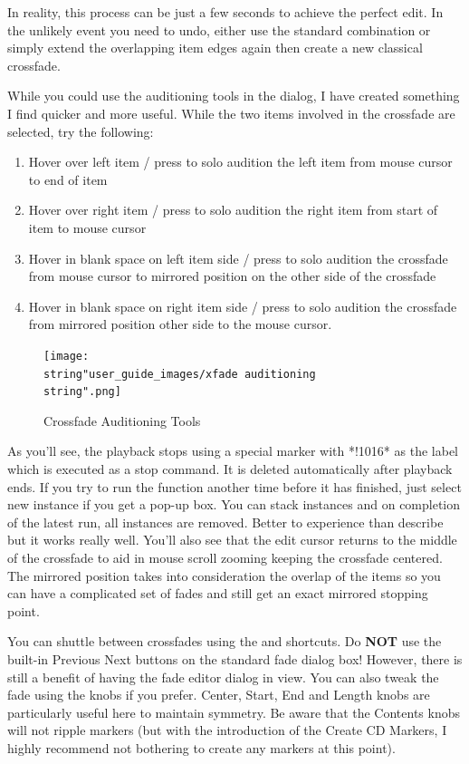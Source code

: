 \documentclass[10pt,american]{article}
\begin{document}
In reality, this process can be just a few seconds to achieve the perfect edit.
In the unlikely event you need to undo, either use the standard 
combination or simply extend the overlapping item edges again then create a new
classical crossfade.

While you could use the auditioning tools in the dialog, I have created
something I find quicker and more useful. While the two items involved in the
crossfade are selected, try the following:
\begin{enumerate}
\item Hover over left item / press  to solo audition the left item from
mouse cursor to end of item
\item Hover over right item / press  to solo audition the right item
from start of item to mouse cursor
\item Hover in blank space on left item side / press  to solo audition
the crossfade from mouse cursor to mirrored position on the other side of the
crossfade
\item Hover in blank space on right item side / press  to solo audition
the crossfade from mirrored position other side to the mouse cursor.
\end{enumerate}
\begin{figure}
\texttt{[image: \\string"user\_guide\_images/xfade auditioning\\string".png]}

\caption{Crossfade Auditioning Tools}

\end{figure}

As you'll see, the playback stops using a special marker with {*}!1016{*} as the
label which is executed as a stop command. It is deleted automatically after
playback ends. If you try to run the function another time before it has
finished, just select new instance if you get a pop-up box. You can stack
instances and on completion of the latest run, all instances are removed. Better
to experience than describe but it works really well. You'll also see that the
edit cursor returns to the middle of the crossfade to aid in mouse scroll
zooming keeping the crossfade centered. The mirrored position takes into
consideration the overlap of the items so you can have a complicated set of
fades and still get an exact mirrored stopping point.

You can shuttle between crossfades using the  and  shortcuts. Do
\textbf{NOT} use the built-in Previous Next buttons on the standard fade dialog
box! However, there is still a benefit of having the fade editor dialog in view.
You can also tweak the fade using the knobs if you prefer. Center, Start, End
and Length knobs are particularly useful here to maintain symmetry. Be aware
that the Contents knobs will not ripple markers (but with the introduction of
the Create CD Markers, I highly recommend not bothering to create any markers at
this point).
\end{document}
